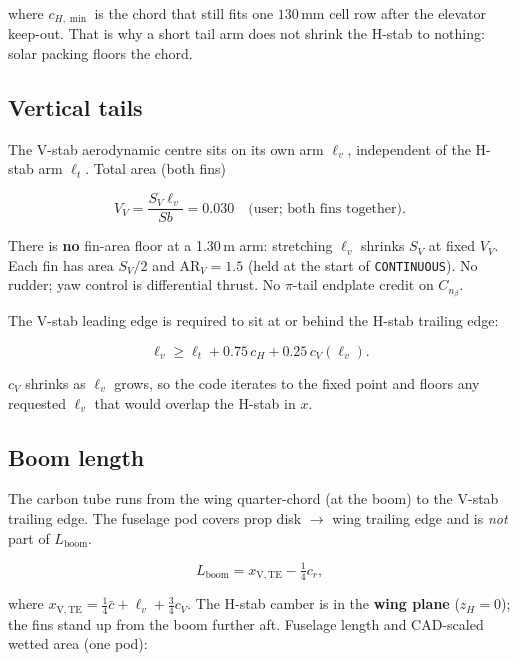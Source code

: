 \documentclass[11pt,letterpaper]{article}
\newcommand{\code}[1]{\texttt{#1}}
\begin{document}
where $c_{H,\min}$ is the chord that still fits one $130\,\mathrm{mm}$ cell row after the elevator keep-out. That is why a short tail arm does not shrink the H-stab to nothing: solar packing floors the chord.

\subsection{Vertical tails}

The V-stab aerodynamic centre sits on its own arm $\ell_v$, independent of the H-stab arm $\ell_t$. Total area (both fins)

\begin{equation}
  V_V = \frac{S_V \ell_v}{S b} = 0.030 \quad \text{(user; both fins together)}.
\end{equation}

There is \textbf{no} fin-area floor at a 1.30\,m arm: stretching $\ell_v$ shrinks $S_V$ at fixed $V_V$. Each fin has area $S_V/2$ and $\mathrm{AR}_V = 1.5$ (held at the start of \code{CONTINUOUS}). No rudder; yaw control is differential thrust. No $\pi$-tail endplate credit on $C_{n_\beta}$.

The V-stab leading edge is required to sit at or behind the H-stab trailing edge:

\begin{equation}
  \ell_v \ge \ell_t + 0.75\, c_H + 0.25\, c_V(\ell_v).
\end{equation}

$c_V$ shrinks as $\ell_v$ grows, so the code iterates to the fixed point and floors any requested $\ell_v$ that would overlap the H-stab in $x$.

\subsection{Boom length}

The carbon tube runs from the wing quarter-chord (at the boom) to the V-stab trailing edge. The fuselage pod covers prop disk $\to$ wing trailing edge and is \emph{not} part of $L_\mathrm{boom}$.

\begin{equation}
  L_\mathrm{boom} = x_{\mathrm{V,TE}} - \tfrac14 c_r,
\end{equation}

where $x_{\mathrm{V,TE}} = \tfrac14 \bar{c} + \ell_v + \tfrac34 c_V$. The H-stab camber is in the \textbf{wing plane} ($z_H = 0$); the fins stand up from the boom further aft. Fuselage length and CAD-scaled wetted area (one pod):
\end{document}
